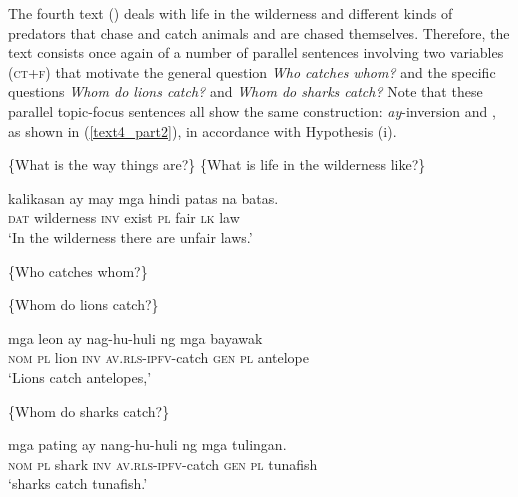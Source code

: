 \documentclass[output=paper,
,modfonts
,nonflat]{langsci/langscibook}
\begin{document}
The fourth text () deals with life in the wilderness and different kinds of predators that chase and catch animals and are chased themselves.  Therefore, the text consists once again of a number of parallel sentences involving two variables \textsc{(ct+f)} that motivate the general question \textit{Who catches whom?} and the specific questions \textit{Whom do lions catch?} and \textit{Whom do sharks catch?} Note that these parallel  topic-focus sentences all show the same construction: \textit{ay}-inversion and , as shown in (\ref{text4_part2}), in accordance with Hypothesis (i).

\begin{exe}
\ex\label{text4_part1}
\begin{xlist}
 \{What is the way things are?\}
 \{What is life in the wilderness like?\}
\end{xlist}
\begin{xlist}[{>}> A\textsubscript{{0.1}}:]
 {kalikasan{\cb}\ctopic} ay {{\ob}may} mga hindi patas na {batas{\cb}\focus{\cb}\sq}.\\
\textsc{\void{[[}dat} wilderness \textsc{inv} {\void{[}exist} \textsc{pl}  fair \textsc{lk} law\\ 
\glt `In the wilderness there are unfair laws.'
\end{xlist}
\end{exe}
\begin{exe}
\ex\label{text4_part2}
\begin{xlist}[{>}> A\textsubscript{{0.1}}:]
 \{Who catches whom?\}
\end{xlist}
\begin{xlist}[{>}{>}> Q\textsubscript{{1.2}}:]
 \{Whom do lions catch?\}
\end{xlist}
\begin{xlist}[{>}>{>}> A\textsubscript{{1.2}}:]
 mga {leon{\cb}\ctopic} ay {nag-hu-huli}  {{\ob}ng} mga {bayawak{\cb}\focus{\cb}\sq}\\
\textsc{\void{[[}nom} \textsc{pl} lion \textsc{inv} \textsc{av.rls-ipfv}-catch \textsc{\void{[}gen} \textsc{pl} antelope\\
\glt `Lions catch antelopes,'
\end{xlist}
\begin{xlist}
 \{Whom do sharks catch?\}
\end{xlist}
\begin{xlist}[{>}>{>}> A\textsubscript{{1.2}}:]
 mga {pating{\cb}\ctopic} ay nang-hu-huli {{\ob}ng} mga {tulingan{\cb}\focus{\cb}\sq}.\\
\textsc{\void{[[}nom} \textsc{pl} shark \textsc{inv} \textsc{av.rls-ipfv}-catch \textsc{\void{[}gen} \textsc{pl} tunafish\\
\glt `sharks catch tunafish.'
\end{xlist}
\end{exe}
\end{document}
